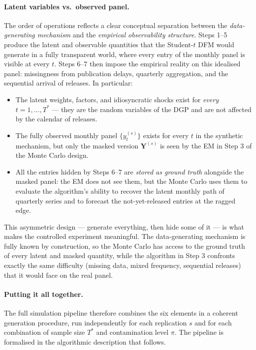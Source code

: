 \documentclass[11pt, a4paper, oneside]{article}
\newcommand{\mY}{\mathbf{Y}}
\begin{document}
\paragraph{Latent variables vs.\ observed panel.}
The order of operations reflects a clear conceptual separation
between the \emph{data-generating mechanism} and the
\emph{empirical observability structure}. Steps 1--5 produce the
latent and observable quantities that the Student-$t$ DFM would
generate in a fully transparent world, where every entry of the
monthly panel is visible at every $t$. Steps 6--7 then impose the
empirical reality on this idealised panel: missingness from
publication delays, quarterly aggregation, and the sequential
arrival of releases. In particular:
\begin{itemize}[leftmargin=1.5em, itemsep=3pt]
    \item The latent weights, factors, and idiosyncratic shocks
          exist for \emph{every} $t = 1, \ldots, T^*$ — they are
          the random variables of the DGP and are not affected by
          the calendar of releases.
    \item The fully observed monthly panel $\{y_t^{(s)}\}$
          exists for every $t$ in the synthetic mechanism, but
          only the masked version $\mY^{(s)}$ is seen by the EM
          in Step 3 of the Monte Carlo design.
    \item All the entries hidden by Steps 6--7 are
          \emph{stored as ground truth} alongside the masked
          panel: the EM does not see them, but the Monte Carlo
          uses them to evaluate the algorithm's ability to
          recover the latent monthly path of quarterly series and
          to forecast the not-yet-released entries at the
          ragged edge.
\end{itemize}
This asymmetric design — generate everything, then hide some of it —
is what makes the controlled experiment meaningful. The
data-generating mechanism is fully known by construction, so the
Monte Carlo has access to the ground truth of every latent and
masked quantity, while the algorithm in Step 3 confronts exactly
the same difficulty (missing data, mixed frequency, sequential
releases) that it would face on the real panel.

\paragraph{Putting it all together.}
The full simulation pipeline therefore combines the six elements
in a coherent generation procedure, run independently for each
replication $s$ and for each combination of sample size $T^*$ and
contamination level $\pi$. The pipeline is formalised in the
algorithmic description that follows.
\end{document}
